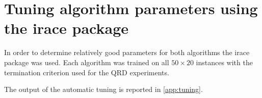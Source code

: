 \section{Tuning algorithm parameters using the irace package}
\label{tune}

In order to determine relatively good parameters for both algorithms the irace package was used.
Each algorithm was trained on all $50 \times 20$ instances with the termination criterion used for the QRD experiments.

The output of the automatic tuning is reported in \ref{app:tuning}.